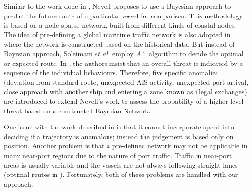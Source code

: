 \documentclass[12pt,glossary]{dalcsthesis}
\begin{document}
Similar to the work done in \cite{PallottaFramework}, Nevell \cite{bn_White} proposes to use a Bayesian approach to predict the future route of a particular vessel for comparison. This methodology is based on a node-sparse network, built from different kinds of coastal nodes. The idea of pre-defining a global maritime traffic network is also adopted in \cite{Soleimani} where the network is constructed based on the historical data. But instead of Bayesian approach, Soleimani $et$ $al.$ \cite{Soleimani} employ $A*$ \cite{astar} algorithm to decide the optimal or expected route.
In \cite{bn_Richard}, the authors insist that an overall threat is indicated by a sequence of the individual behaviours. Therefore, five specific anomalies (deviation from standard route, unexpected AIS activity, unexpected port arrival, close approach with another ship and entering a zone known as illegal exchanges) are introduced to extend Nevell's work \cite{bn_White} to assess the probability of a higher-level threat based on a constructed Bayesian Network.

One issue with the work described in \cite{bn_White}\cite{bn_Richard} is that it cannot incorporate speed into deciding if a trajectory is anomalous; instead the judgement is based only on position. Another problem is that a pre-defined network may not be applicable in many near-port regions due to the nature of port traffic. Traffic in near-port areas is usually  variable and the vessels are not always following straight lanes (optimal routes in \cite{bn_White}\cite{bn_Richard}). Fortunately, both of these problems are handled with our approach.


\end{document}
